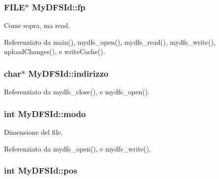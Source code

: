 \hypertarget{structMyDFSId_ae2badd91d3b506420a9e49554df8212d}{
\subsubsection[{fp}]{\setlength{\rightskip}{0pt plus 5cm}F\+I\+L\+E$\ast$ My\+D\+F\+S\+Id\+::fp}}\label{structMyDFSId_ae2badd91d3b506420a9e49554df8212d}


Come sopra, ma read. 



Referenziato da main(), mydfs\+\_\+open(), mydfs\+\_\+read(), mydfs\+\_\+write(), upload\+Changes(), e write\+Cache().

\hypertarget{structMyDFSId_ac8c10a1a5b18776bf5e5585ee9e26331}{
\subsubsection[{indirizzo}]{\setlength{\rightskip}{0pt plus 5cm}char$\ast$ My\+D\+F\+S\+Id\+::indirizzo}}\label{structMyDFSId_ac8c10a1a5b18776bf5e5585ee9e26331}


Referenziato da mydfs\+\_\+close(), e mydfs\+\_\+open().

\hypertarget{structMyDFSId_a98bc5ce1a7734459d8b81c997da4e9f0}{
\subsubsection[{modo}]{\setlength{\rightskip}{0pt plus 5cm}int My\+D\+F\+S\+Id\+::modo}}\label{structMyDFSId_a98bc5ce1a7734459d8b81c997da4e9f0}


Dimensione del file. 



Referenziato da mydfs\+\_\+open(), e mydfs\+\_\+write().

\hypertarget{structMyDFSId_aaeac229fb85c313f91a76f00be916832}{
\subsubsection[{pos}]{\setlength{\rightskip}{0pt plus 5cm}int My\+D\+F\+S\+Id\+::pos}}\label{structMyDFSId_aaeac229fb85c313f91a76f00be916832}


